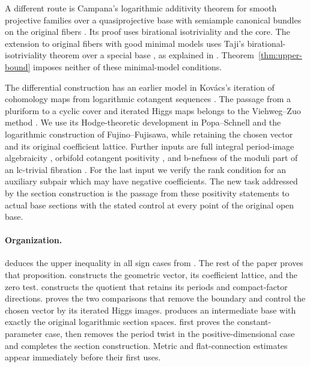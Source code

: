 A different route is Campana's logarithmic additivity theorem for
smooth projective families over a quasiprojective base with semiample
canonical bundles on the original fibers
\cite[Theorem 1]{CampanaAdditivity}. Its proof uses birational
isotriviality and the core. The extension to original fibers with good
minimal models uses Taji's birational-isotriviality theorem over a
special base \cite[Theorem 1.1]{Taji}, as explained in
\cite[Remark 2(1)]{CampanaAdditivity}.
Theorem~\ref{thm:upper-bound} imposes neither of these minimal-model
conditions.

The differential construction has an earlier model in Kov\'acs's
iteration of cohomology maps from logarithmic cotangent sequences
\cite[Section 1, Lemma 1.1]{KovacsFineModuli}. The passage from a
pluriform to a cyclic cover and iterated Higgs maps belongs to the
Viehweg--Zuo method
\cite[Introduction, Lemma 1.1, and Section 3]{ViehwegZuoIsotriviality}.
We use its Hodge-theoretic development in Popa--Schnell and the
logarithmic construction of Fujino--Fujisawa, while retaining the
chosen vector and its original coefficient lattice. Further inputs
are full integral period-image algebraicity \cite{BBT}, orbifold
cotangent positivity \cite{CP}, and b-nefness of the moduli part of
an lc-trivial fibration \cite{FG}. For the last input we verify the
rank condition for an auxiliary subpair which may have negative
coefficients. The new task addressed by the section construction is
the passage from these positivity statements to actual base sections
with the stated control at every point of the original open base.

\paragraph{Organization.}
 deduces the upper inequality in all sign cases from
. The rest of the paper proves that
proposition.  constructs the geometric vector,
its coefficient lattice, and the zero test. 
constructs the quotient that retains its periods and compact-factor
directions.  proves the two comparisons that remove
the boundary and control the chosen vector by its iterated Higgs images.
 produces an intermediate base with exactly the
original logarithmic section spaces.  first proves
the constant-parameter case, then removes the period twist in the
positive-dimensional case and completes the section construction. Metric and
flat-connection estimates appear immediately before their first uses.
